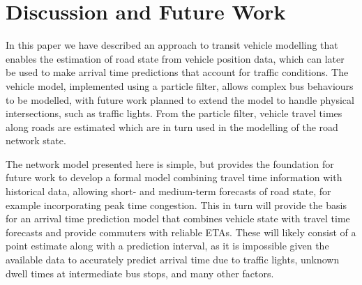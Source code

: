 \section{Discussion and Future Work}
\label{sec:discussion}

In this paper we have described an approach to transit vehicle modelling
that enables the \rt estimation of road state from vehicle position data,
which can later be used to make arrival time predictions
that account for \rt traffic conditions.
The vehicle model, implemented using a particle filter,
allows complex bus behaviours to be modelled,
with future work planned to extend the model to handle physical intersections,
such as traffic lights.
From the particle filter,
vehicle travel times along roads are estimated which are in turn used 
in the modelling of the road network state.


The network model presented here is simple,
but provides the foundation for future work to
develop a formal model combining \rt travel time information with historical data, 
allowing short- and medium-term forecasts of road state,
for example incorporating peak time congestion.
This in turn will provide the basis for an arrival time prediction model
that combines \rt vehicle state with travel time forecasts
and provide commuters with reliable ETAs.
These will likely consist of a point estimate along with a prediction interval,
as it is impossible given the available data to accurately predict arrival time
due to traffic lights, unknown dwell times at intermediate bus stops,
and many other factors.








